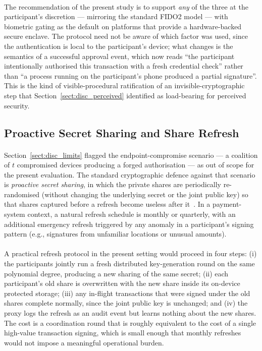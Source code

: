 \paragraph{}The recommendation of the present study is to support \textit{any} of the three at the participant's discretion --- mirroring the standard FIDO2 model --- with biometric gating as the default on platforms that provide a hardware-backed secure enclave. The protocol need not be aware of which factor was used, since the authentication is local to the participant's device; what changes is the semantics of a successful approval event, which now reads ``the participant intentionally authorised this transaction with a fresh credential check'' rather than ``a process running on the participant's phone produced a partial signature''. This is the kind of visible-procedural ratification of an invisible-cryptographic step that Section~\ref{sect:disc_perceived} identified as load-bearing for perceived security.

\subsection{Proactive Secret Sharing and Share Refresh}
\label{sect:rec_proactive}

\paragraph{}Section~\ref{sect:disc_limits} flagged the endpoint-compromise scenario --- a coalition of $t$ compromised devices producing a forged authorisation --- as out of scope for the present evaluation. The standard cryptographic defence against that scenario is \textit{proactive secret sharing}, in which the private shares are periodically re-randomised (without changing the underlying secret or the joint public key) so that shares captured before a refresh become useless after it~\cite{shamir1979, gennaro2007}. In a payment-system context, a natural refresh schedule is monthly or quarterly, with an additional emergency refresh triggered by any anomaly in a participant's signing pattern (e.g., signatures from unfamiliar locations or unusual amounts).

\paragraph{}A practical refresh protocol in the present setting would proceed in four steps: (i) the participants jointly run a fresh distributed key-generation round on the same polynomial degree, producing a new sharing of the same secret; (ii) each participant's old share is overwritten with the new share inside its on-device protected storage; (iii) any in-flight transactions that were signed under the old shares complete normally, since the joint public key is unchanged; and (iv) the proxy logs the refresh as an audit event but learns nothing about the new shares. The cost is a coordination round that is roughly equivalent to the cost of a single high-value transaction signing, which is small enough that monthly refreshes would not impose a meaningful operational burden.


